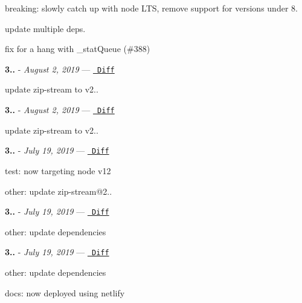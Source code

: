 \begin{DoxyItemize}
\item breaking\+: slowly catch up with node LTS, remove support for versions under 8.
\item update multiple deps.
\item fix for a hang with \+\_\+stat\+Queue (\#388)
\end{DoxyItemize}

{\bfseries{3..}} -\/ 
\footnotesize {\itshape August 2, 2019}
\normalsize  — \href{https://github.com/archiverjs/node-archiver/compare/3.1.0...3.1.1}{\texttt{ Diff}}


\begin{DoxyItemize}
\item update zip-\/stream to v2..
\end{DoxyItemize}

{\bfseries{3..}} -\/ 
\footnotesize {\itshape August 2, 2019}
\normalsize  — \href{https://github.com/archiverjs/node-archiver/compare/3.0.3...3.1.0}{\texttt{ Diff}}


\begin{DoxyItemize}
\item update zip-\/stream to v2..
\end{DoxyItemize}

{\bfseries{3..}} -\/ 
\footnotesize {\itshape July 19, 2019}
\normalsize  — \href{https://github.com/archiverjs/node-archiver/compare/3.0.2...3.0.3}{\texttt{ Diff}}


\begin{DoxyItemize}
\item test\+: now targeting node v12
\item other\+: update zip-\/stream@2..
\end{DoxyItemize}

{\bfseries{3..}} -\/ 
\footnotesize {\itshape July 19, 2019}
\normalsize  — \href{https://github.com/archiverjs/node-archiver/compare/3.0.1...3.0.2}{\texttt{ Diff}}


\begin{DoxyItemize}
\item other\+: update dependencies
\end{DoxyItemize}

{\bfseries{3..}} -\/ 
\footnotesize {\itshape July 19, 2019}
\normalsize  — \href{https://github.com/archiverjs/node-archiver/compare/3.0.0...3.0.1}{\texttt{ Diff}}


\begin{DoxyItemize}
\item other\+: update dependencies
\item docs\+: now deployed using netlify
\end{DoxyItemize}

